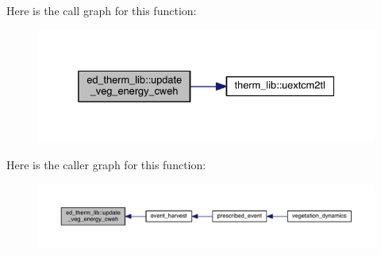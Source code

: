 Here is the call graph for this function\+:\nopagebreak
\begin{figure}[H]
\begin{center}
\leavevmode
\includegraphics[width=332pt]{namespaceed__therm__lib_ae2a805729a52bf5814d2c3a0d84f6fe8_cgraph}
\end{center}
\end{figure}




Here is the caller graph for this function\+:\nopagebreak
\begin{figure}[H]
\begin{center}
\leavevmode
\includegraphics[width=350pt]{namespaceed__therm__lib_ae2a805729a52bf5814d2c3a0d84f6fe8_icgraph}
\end{center}
\end{figure}



